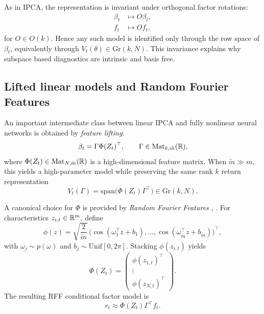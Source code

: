 \documentclass[twoside,11pt,letter]{article}
\begin{document}
As in IPCA, the representation is invariant under orthogonal factor rotations:
\begin{equation*}
\begin{split}
\beta_t &\mapsto O\beta_t,\\
f_t &\mapsto Of_t,
\end{split}
\end{equation*}
for $O\in O(k)$. Hence any such model is identified only through the row space of $\beta_t$, equivalently through $V_t(\theta)\in \mathrm{Gr}(k,N)$. This invariance explains why subspace based diagnostics are intrinsic and basis free.

\subsection{Lifted linear models and Random Fourier Features}
\label{subsec:rff}

An important intermediate class between linear IPCA and fully nonlinear neural networks is obtained by \emph{feature lifting}:
\begin{equation}
\label{eq:liftedlinspec}
\beta_t=\Gamma \Phi(Z_t)^\top,\qquad\Gamma \in \mathrm{Mat}_{k,\tilde m}(\mathbb{R}),
\end{equation}
where $\Phi(Z_t)\in \mathrm{Mat}_{N,\tilde m}(\mathbb{R})$ is a high-dimensional feature matrix. When $\tilde m \gg m$, this yields a high-parameter model while preserving the same rank $k$ return representation
\begin{equation*}
V_t(\Gamma)=\mathrm{span}\big(\Phi(Z_t)\Gamma^\top\big)\in \mathrm{Gr}(k,N).
\end{equation*}

A canonical choice for $\Phi$ is provided by \emph{Random Fourier Features} \cite{RR07}, \cite{RR08}. For characteristics $z_{i,t}\in\mathbb{R}^m$, define
\begin{equation*}
\phi(z)=\sqrt{\frac{2}{\tilde m}}\,\big(\cos(\omega_1^\top z+b_1),\dots,\cos(\omega_{\tilde m}^\top z+b_{\tilde m})\big)^\top,
\end{equation*}
with $\omega_j\sim p(\omega)$ and $b_j\sim\mathrm{Unif}[0,2\pi]$. Stacking $\phi(z_{i,t})$ yields
\begin{equation*}
\Phi(Z_t)=
\begin{pmatrix}
\phi(z_{1,t})^\top \\
\vdots \\
\phi(z_{N,t})^\top
\end{pmatrix}.
\end{equation*}
The resulting RFF conditional factor model is
\begin{equation}
r_t \approx \Phi(Z_t)\Gamma^\top f_t.
\end{equation}
\end{document}
